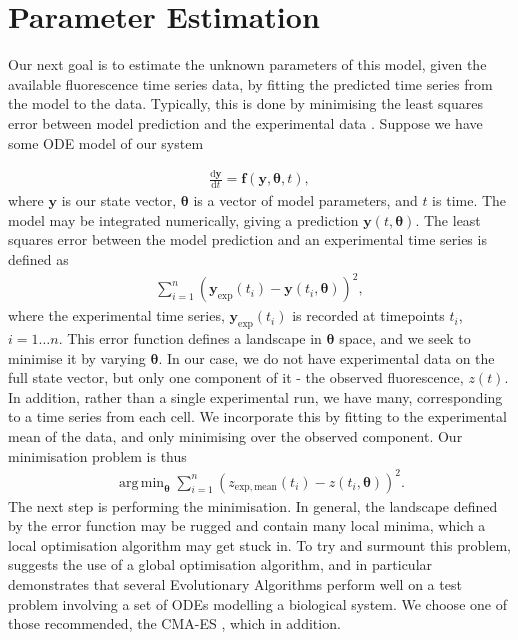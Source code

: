 \documentclass[10pt,journal]{./IEEE_latex_class/IEEEtran}
\DeclareMathOperator*{\argmin}{arg\,min}
\begin{document}



\section{Parameter Estimation}
\label{Parameter Estimation}

Our next goal is to estimate the unknown parameters of this model, given the available fluorescence time series data, by fitting the predicted time series from the model to the data. Typically, this is done by minimising the least squares error between model prediction and the experimental data \cite{Brewer2008,Algorithms2003, Hu2015}. Suppose we have some ODE model of our system

\begin{align}
\frac{\mathrm{d}\mathbf{y}}{\mathrm{d}t} = \mathbf{f}(\mathbf{y},\boldsymbol{\theta},t),
\end{align}
where $\mathbf{y}$ is our state vector, $\boldsymbol{\theta}$ is a vector of model parameters, and $t$ is time. The model may be integrated numerically, giving a prediction $\mathbf{y}(t,\boldsymbol{\theta})$. The least squares error between the model prediction and an experimental time series is defined as
\begin{align}
 \sum_{i =1}^{n} (\mathbf{y}_{\mathrm{exp}}(t_{i}) - \mathbf{y}(t_{i},\boldsymbol{\theta}))^2,
\end{align}
where the experimental time series, $\mathbf{y}_{\mathrm{exp}}(t_{i})$ is recorded at timepoints $t_{i}$, $i = 1 \hdots n$. This error function defines a landscape in $\boldsymbol{\theta}$ space, and we seek to minimise it by varying $\boldsymbol{\theta}$. In our case, we do not have experimental data on the full state vector, but only one component of it - the observed fluorescence, $z(t)$. In addition, rather than a single experimental run, we have many, corresponding to a time series from each cell. We incorporate this by fitting to the experimental mean of the data, and only minimising over the observed component. Our minimisation problem is thus
\begin{align}
\argmin_{\boldsymbol{\theta}} \sum_{i =1}^{n} (z_{\mathrm{exp, mean}}(t_{i}) - z(t_{i},\boldsymbol{\theta}))^2.
\label{eq:min}
\end{align}
The next step is performing the minimisation. In general, the landscape defined by the error function may be rugged and contain many local minima, which a local optimisation algorithm may get stuck in. To try and surmount this problem, \cite{Algorithms2003} suggests the use of a global optimisation algorithm, and in particular demonstrates that several Evolutionary Algorithms perform well on a test problem involving a set of ODEs modelling a biological system. We choose one of those recommended, the CMA-ES \cite{Hansen2006,Hansen2011}, which in addition. 
\end{document}
